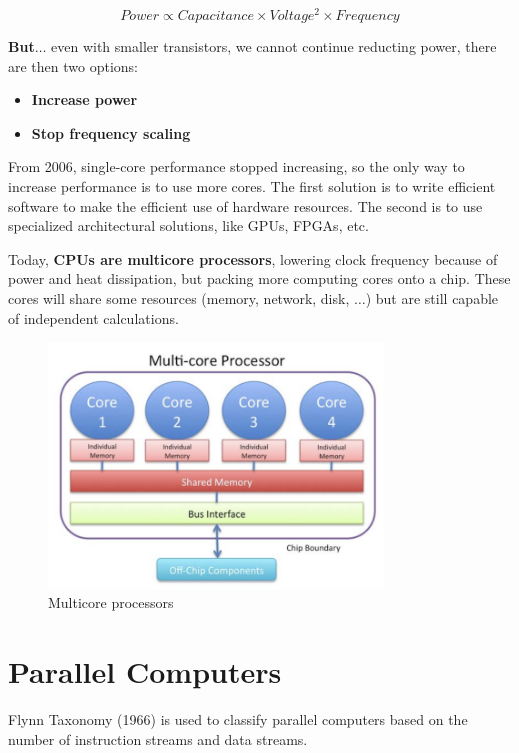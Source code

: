 \[
    Power \propto Capacitance \times Voltage^2 \times Frequency
\]

\textbf{But$\dots$} even with smaller transistors, we cannot continue reducting power, there are then two options: 
\begin{itemize}
    \item \textbf{Increase power}
    \item \textbf{Stop frequency scaling}
\end{itemize}

From 2006, single-core performance stopped increasing, so the only way to increase performance is to use more cores. The first solution is to write efficient software to make the efficient use of hardware resources. The second is to use specialized architectural solutions, like GPUs, FPGAs, etc.

Today, \textbf{CPUs are multicore processors}, lowering clock frequency because of power and heat dissipation, but packing more computing cores onto a chip. These cores will share some resources (memory, network, disk, $\dots$) but are still capable of independent calculations.

\begin{figure}
    \centering
    \includegraphics[width=0.8\textwidth]{assets/fig3.png}
    \caption{Multicore processors}
    \label{fig:multicore_processors}
\end{figure}

\section{Parallel Computers}

Flynn Taxonomy (1966) is used to classify parallel computers based on the number of instruction streams and data streams.

